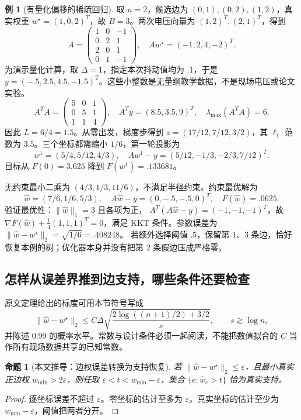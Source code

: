 \documentclass[UTF8,11pt,fontset=fandol,openany,oneside]{ctexbook}
\newtheorem{proposition}[theorem]{命题}
\theoremstyle{definition}
\newtheorem{example}[theorem]{例}
\theoremstyle{remark}
\numberwithin{equation}{chapter}
\begin{document}
\begin{example}[有量化偏移的稀疏回归]
取 $n=2$，候选边为 $(0,1),(0,2),(1,2)$，真实权重
$w^\star=(1,0,2)^T$，故 $B=3$。两次电压向量为 $(1,2)^T,(2,1)^T$，得到
\[
 A=\begin{pmatrix}1&0&-1\\0&2&1\\2&0&1\\0&1&-1\end{pmatrix},\quad
 Aw^\star=(-1,2,4,-2)^T.
\]
为演示量化计算，取 $\Delta=1$，指定本次抖动值均为 $.1$，于是
$y=(-.5,2.5,4.5,-1.5)^T$。这些小整数是无量纲教学数据，不是现场电压或论文实验。
\[
 A^TA=\begin{pmatrix}5&0&1\\0&5&1\\1&1&4\end{pmatrix},\quad
 A^Ty=(8.5,3.5,9)^T,\quad \lambda_{\max}(A^TA)=6.
\]
因此 $L=6/4=1.5$。从零出发，梯度步得到
$z=(17/12,7/12,3/2)$，其 $\ell_1$ 范数为 $3.5$。三个坐标都需缩小 $1/6$，第一轮投影为
\[
 w^1=(5/4,5/12,4/3),\quad
 Aw^1-y=(5/12,-1/3,-2/3,7/12)^T.
\]
目标从 $F(0)=3.625$ 降到 $F(w^1)=.133681$。

无约束最小二乘为 $(4/3,1/3,11/6)$，不满足半径约束。约束最优解为
\[
 \hat w=(7/6,1/6,5/3),\quad A\hat w-y=(0,-.5,-.5,0)^T,
 \quad F(\hat w)=.0625.
\]
验证最优性：$\|\hat w\|_1=3$ 且各项为正，
$A^T(A\hat w-y)=(-1,-1,-1)^T$，故
$\nabla F(\hat w)+\tfrac14(1,1,1)^T=0$，满足 KKT 条件。参数误差为
$\|\hat w-w^\star\|_2=\sqrt{1/6}=.408248$。
若额外选择阈值 $.5$，保留第 1、3 条边，恰好恢复本例的树；优化器本身并没有把第 2 条假边压成严格零。
\end{example}

\subsection{怎样从误差界推到边支持，哪些条件还要检查}

原文定理给出的标度可用本节符号写成
\begin{equation}
 \|\hat w-w^\star\|_2\le
 C\Delta\sqrt{\frac{2\log((n+1)/2)+3/2}{s}},
 \qquad s\gtrsim\log n,
 \label{eq:dq_s7_rate}
\end{equation}
并陈述 $0.99$ 的概率水平。常数与设计条件必须一起阅读，不能把数值拟合的 $C$ 当作所有现场数据共享的已知常数。

\begin{proposition}[本文推导：边权误差转换为支持恢复]
若 $\|\hat w-w^\star\|_2\le\varepsilon$，且最小真实正边权
$w_{\min}>2\varepsilon$，则任取
$\varepsilon<t<w_{\min}-\varepsilon$，集合
$\{e:\hat w_e>t\}$ 恰为真实支持。
\end{proposition}
\begin{proof}
逐坐标误差不超过 $\varepsilon$。零坐标的估计至多为 $\varepsilon$，真实坐标的估计至少为 $w_{\min}-\varepsilon$，阈值把两者分开。
\end{proof}
\end{document}
